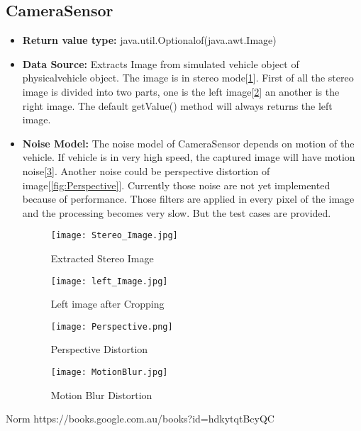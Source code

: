\documentclass[]{article}
\begin{document}
    \subsection{CameraSensor}
        \begin{itemize}
        \item \textbf{Return value type:} java.util.Optionalof(java.awt.Image)
        \item \textbf{Data Source:} Extracts Image from simulated vehicle object of physicalvehicle object. The image is in stereo mode[\ref{fig::stereo}]. First of all the stereo image is divided into two parts, one is the left image[\ref{fig::left_image}] an another is the right image. The default getValue() method will always returns the left image.
        \item \textbf{Noise Model:} The noise model of CameraSensor depends on motion of the vehicle. If vehicle is in very high speed, the captured image will have motion noise[\ref{fig:MotionBlur}]. Another noise could be perspective distortion of image[\ref{fig:Perspective}]. Currently those noise are not yet implemented because of performance. Those filters are applied in every pixel of the image and the processing becomes very slow. But the test cases are provided.
            \begin{figure}[H]
            	\centering
            	\texttt{[image: Stereo\_Image.jpg]}
            	\caption{Extracted Stereo Image}
            	\label{fig::stereo}
            \end{figure}
            \begin{figure}[H]
            	\centering
            	\texttt{[image: left\_Image.jpg]}
            	\caption{Left image after Cropping}
            	\label{fig::left_image}
            \end{figure}
            \begin{figure}
            \centering
            \begin{minipage}{.5\textwidth}
              \centering
              \texttt{[image: Perspective.png]}
              \caption{Perspective Distortion}
              \label{fig:Perspective}
            \end{minipage}%
            \begin{minipage}{.5\textwidth}
              \centering
              \texttt{[image: MotionBlur.jpg]}
              \caption{Motion Blur Distortion}
              \label{fig:MotionBlur}
            \end{minipage}
            \end{figure}

            \end{itemize}

\newpage
\begin{thebibliography}{9}
Norm {https://books.google.com.au/books?id=hdkytqtBcyQC}
\end{thebibliography}
\end{document}
